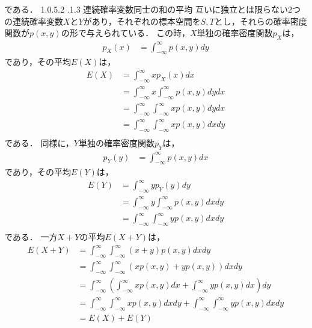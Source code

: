 \documentclass[dvipdfmx]{jsarticle}
\makeatletter
\newcommand{\subsubsubsection}{\@startsection{paragraph}{4}{\z@}%
 {1.0\Cvs \@plus.5\Cdp \@minus.2\Cdp}%
 {.1\Cvs \@plus.3\Cdp}%
 {\reset@font\sffamily\normalsize}
}
\makeatother
\begin{document}
である．
 \subsubsubsection{連続確率変数同士の和の平均}
互いに独立とは限らない2つの連続確率変数$X$と$Y$があり，それぞれの標本空間を$S,T$とし，それらの確率密度関数が$p\left(x,y\right)$の形で与えられている．
この時，$X$単独の確率密度関数$p_X$は，
 \begin{align}
  p_X\left(x\right)&=\int_{-\infty}^\infty p\left(x,y\right)dy
 \end{align}
であり，その平均$E\left(X\right)$は，
 \begin{align}
  E\left(X\right)&=\int_{-\infty}^\infty xp_X\left(x\right)dx\nonumber\\
  &=\int_{-\infty}^\infty x\int_{-\infty}^\infty p\left(x,y\right)dydx\nonumber\\
  &=\int_{-\infty}^\infty \int_{-\infty}^\infty xp\left(x,y\right)dydx\nonumber\\
  &=\int_{-\infty}^\infty \int_{-\infty}^\infty xp\left(x,y\right)dxdy\nonumber\\
 \end{align}
である．
同様に，$Y$単独の確率密度関数$p_Y$は，
 \begin{align}
  p_Y\left(y\right)&=\int_{-\infty}^\infty p\left(x,y\right)dx
 \end{align}
であり，その平均$E\left(Y\right)$は，
 \begin{align}
  E\left(Y\right)&=\int_{-\infty}^\infty yp_Y\left(y\right)dy\nonumber\\
  &=\int_{-\infty}^\infty y\int_{-\infty}^\infty p\left(x,y\right)dxdy\nonumber\\
  &=\int_{-\infty}^\infty \int_{-\infty}^\infty yp\left(x,y\right)dxdy\nonumber\\
 \end{align}
である．
一方$X+Y$の平均$E\left(X+Y\right)$は，
 \begin{align}
  E\left(X+Y\right)&=\int_{-\infty}^\infty\int_{-\infty}^\infty\left(x+y\right)p\left(x,y\right)dxdy\nonumber\\
  &=\int_{-\infty}^\infty\int_{-\infty}^\infty\left(xp\left(x,y\right)+yp\left(x,y\right)\right)dxdy\nonumber\\
  &=\int_{-\infty}^\infty\left(\int_{-\infty}^\infty xp\left(x,y\right)dx+\int_{-\infty}^\infty yp\left(x,y\right)dx\right)dy\nonumber\\
  &=\int_{-\infty}^\infty\int_{-\infty}^\infty xp\left(x,y\right)dxdy+\int_{-\infty}^\infty\int_{-\infty}^\infty yp\left(x,y\right)dxdy\nonumber\\
  &=E\left(X\right)+E\left(Y\right)
 \end{align}
\end{document}
